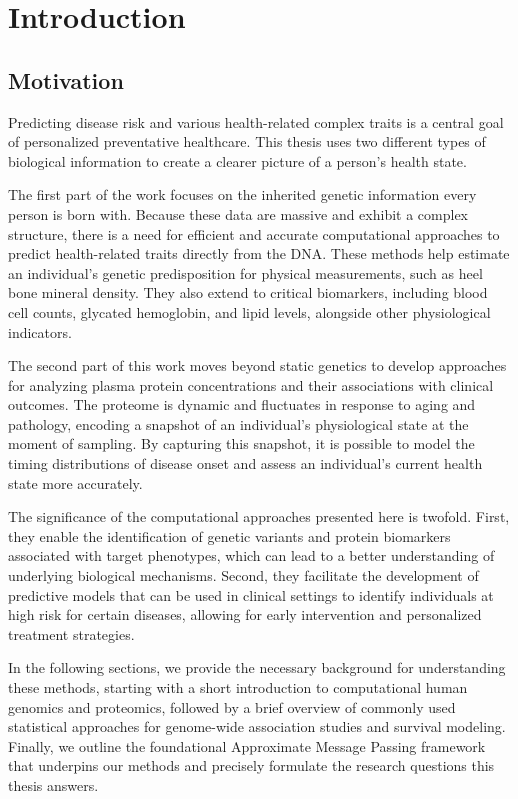 \chapter{Introduction}

\section{Motivation}

Predicting disease risk and various health-related complex traits is a central goal of personalized preventative healthcare. This thesis uses two different types of biological information to create a clearer picture of a person's health state.

The first part of the work focuses on the inherited genetic information every person is born with. Because these data are massive and exhibit a complex structure, there is a need for efficient and accurate computational approaches to predict health-related traits directly from the DNA. These methods help estimate an individual's genetic predisposition for physical measurements, such as heel bone mineral density. They also extend to critical biomarkers, including blood cell counts, glycated hemoglobin, and lipid levels, alongside other physiological indicators.

The second part of this work moves beyond static genetics to develop approaches for analyzing plasma protein concentrations and their associations with clinical outcomes. The proteome is dynamic and fluctuates in response to aging and pathology, encoding a snapshot of an individual's physiological state at the moment of sampling. By capturing this snapshot, it is possible to model the timing distributions of disease onset and assess an individual's current health state more accurately.

The significance of the computational approaches presented here is twofold. First, they enable the identification of genetic variants and protein biomarkers associated with target phenotypes, which can lead to a better understanding of underlying biological mechanisms. Second, they facilitate the development of predictive models that can be used in clinical settings to identify individuals at high risk for certain diseases, allowing for early intervention and personalized treatment strategies.

In the following sections, we provide the necessary background for understanding these methods, starting with a short introduction to computational human genomics and proteomics, followed by a brief overview of commonly used statistical approaches for genome-wide association studies and survival modeling. Finally, we outline the foundational Approximate Message Passing framework that underpins our methods and precisely formulate the research questions this thesis answers.

